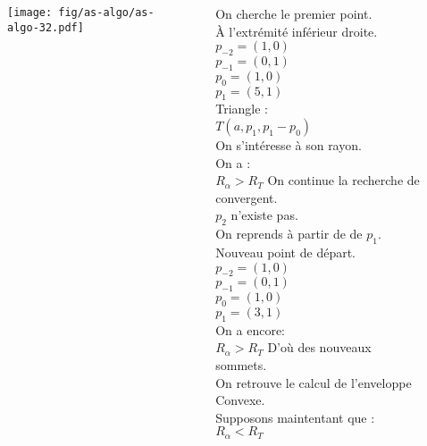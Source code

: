 \documentclass{beamer}
\begin{document}
\begin{frame}
\begin{columns}[t]
\begin{column}{7cm}
{\begin{figure}[h!]
      \end{figure}
      }
      {
        \begin{figure}[h!]
          \centering
          \texttt{[image: fig/as-algo/as-algo-32.pdf]}
      \end{figure}
      }
    \end{column}
    \begin{column}{3cm}
      \begin{block}{}
        {
          On cherche le premier point.\\
          À l'extrémité inférieur droite. 
        }
        {
          $p_{-2} = (1, 0)$\\
          $p_{-1} = (0, 1)$\\
        }
        {
          $p_{0} = (1, 0)$\\
          $p_{1} = (5, 1)$\\
        }
        {
          Triangle : \\
          $T(a, p_{1}, p_{1}-p_{0})$\\
          On s'intéresse à son rayon.\\
        }
        {
          On a :\\
          $R_{\alpha} > R_T$
        }
        {
          On continue la recherche de convergent.\\
          $p_{2}$ n'existe pas.\\
          On reprends à partir de de $p_1$.\\
        }
        {
          Nouveau point de départ.\\
          $p_{-2} = (1, 0)$\\
          $p_{-1} = (0, 1)$\\
          $p_{0} = (1, 0)$\\
          $p_{1} = (3, 1)$\\
        }
        {
          On a encore:\\
          $R_{\alpha} > R_T$
        }
        {
          D'où des nouveaux sommets.\\
        }
        {
          On retrouve le calcul de l'enveloppe Convexe.\\
        }
        {
          Supposons maintentant que :
          $R_{\alpha} < R_T$\\
}
\end{block}
\end{column}
\end{columns}
\end{frame}
\end{document}
